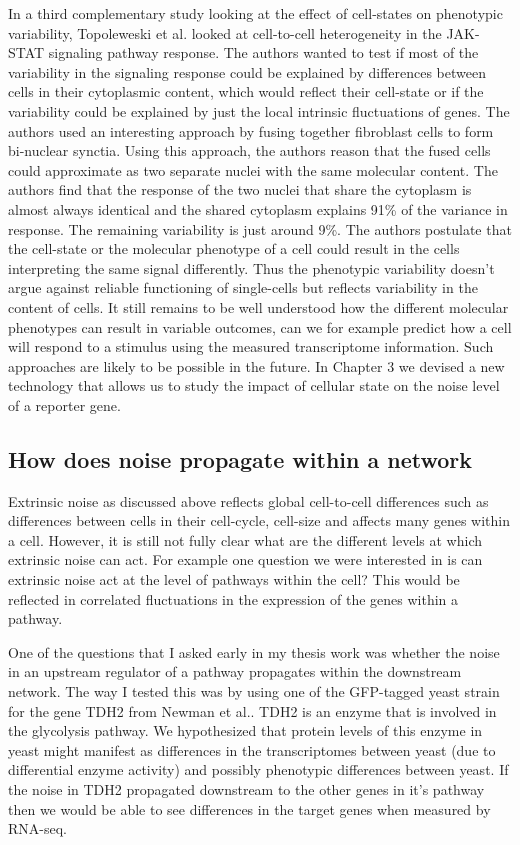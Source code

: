 In a third complementary study looking at the effect of cell-states on phenotypic variability, Topoleweski et al. \cite{topolewski2022ssb} looked at cell-to-cell heterogeneity in the JAK-STAT signaling pathway response. The authors wanted to test if most of the variability in the signaling response could be explained by differences between cells in their cytoplasmic content, which would reflect their cell-state or if the variability could be explained by just the local intrinsic fluctuations of genes. The authors used an interesting approach by fusing together fibroblast cells to form bi-nuclear synctia. Using this approach, the authors reason that the fused cells could approximate as two separate nuclei with the same molecular content. The authors find that the response of the two nuclei that share the cytoplasm is almost always identical and the shared cytoplasm explains 91\% of the variance in response. The remaining variability is just around 9\%. The authors postulate that the cell-state or the molecular phenotype of a cell could result in the cells interpreting the same signal differently. Thus the phenotypic variability doesn't argue against reliable functioning of single-cells but reflects variability in the content of cells. It still remains to be well understood how the different molecular phenotypes can result in variable outcomes, can we for example predict how a cell will respond to a stimulus using the measured transcriptome information. Such approaches are likely to be possible in the future. In Chapter 3 we devised a new technology that allows us to study the impact of cellular state on the noise level of a reporter gene.

\subsection{ How does noise propagate within a network}

Extrinsic noise as discussed above reflects global cell-to-cell differences such as differences between cells in their cell-cycle, cell-size and affects many genes within a cell. However, it is still not fully clear what are the different levels at which extrinsic noise can act. For example one question we were interested in is can extrinsic noise act at the level of pathways within the cell? This would be reflected in correlated fluctuations in the expression of the genes within a pathway.

One of the questions that I asked early in my thesis work was whether the noise in an upstream regulator of a pathway propagates within the downstream network. The way I tested this was by using one of the GFP-tagged yeast strain for the gene TDH2 from Newman et al.\cite{newman2006na}. TDH2 is an enzyme that is involved in the glycolysis pathway. We hypothesized that protein levels of this enzyme in yeast might manifest as differences in the transcriptomes between yeast (due to differential enzyme activity) and possibly phenotypic differences between yeast. If the noise in TDH2 propagated downstream to the other genes in it's pathway then we would be able to see differences in the target genes when measured by RNA-seq. 


